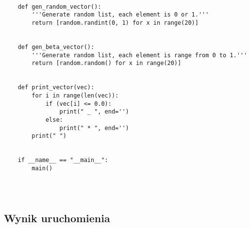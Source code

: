 \documentclass[11pt]{article}
\begin{document}
\begin{lstlisting}
    
    def gen_random_vector():
        '''Generate random list, each element is 0 or 1.'''
        return [random.randint(0, 1) for x in range(20)]
    
    
    def gen_beta_vector():
        '''Generate random list, each element is range from 0 to 1.'''
        return [random.random() for x in range(20)]
    
    
    def print_vector(vec):
        for i in range(len(vec)):
            if (vec[i] <= 0.0):
                print(" _ ", end='')
            else:
                print(" * ", end='')
        print(" ")
    
    
    if __name__ == "__main__":
        main()
    
    
    
    \end{lstlisting}
    \subsection{Wynik uruchomienia}
\end{document}
